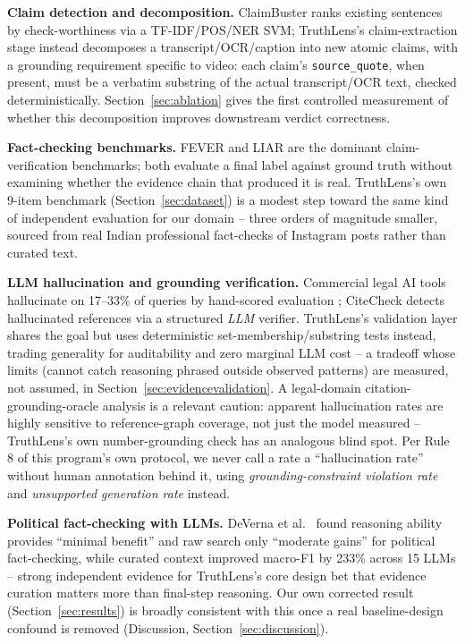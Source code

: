 \documentclass[conference]{IEEEtran}
\begin{document}
\textbf{Claim detection and decomposition.} ClaimBuster
\cite{hassan2017claimbuster} ranks existing sentences by check-worthiness
via a TF-IDF/POS/NER SVM; TruthLens's claim-extraction stage instead
decomposes a transcript/OCR/caption into new atomic claims, with a
grounding requirement specific to video: each claim's
\texttt{source\_quote}, when present, must be a verbatim substring of the
actual transcript/OCR text, checked deterministically.
Section~\ref{sec:ablation} gives the first controlled measurement of
whether this decomposition improves downstream verdict correctness.

\textbf{Fact-checking benchmarks.} FEVER \cite{thorne2018fever} and LIAR
\cite{wang2017liar} are the dominant claim-verification benchmarks; both
evaluate a final label against ground truth without examining whether the
evidence chain that produced it is real. TruthLens's own 9-item benchmark
(Section~\ref{sec:dataset}) is a modest step toward the same kind of
independent evaluation for our domain -- three orders of magnitude
smaller, sourced from real Indian professional fact-checks of Instagram
posts rather than curated text.

\textbf{LLM hallucination and grounding verification.} Commercial legal
AI tools hallucinate on 17--33\% of queries by hand-scored evaluation
\cite{magesh2024hallucinationfree}; CiteCheck \cite{khajavi2026citecheck}
detects hallucinated references via a structured \emph{LLM} verifier.
TruthLens's validation layer shares the goal but uses deterministic
set-membership/substring tests instead, trading generality for
auditability and zero marginal LLM cost -- a tradeoff whose limits
(cannot catch reasoning phrased outside observed patterns) are measured,
not assumed, in Section~\ref{sec:evidencevalidation}. A legal-domain
citation-grounding-oracle analysis is a relevant caution: apparent
hallucination rates are highly sensitive to reference-graph coverage, not
just the model measured \cite{ovcharov2026oracle} -- TruthLens's own
number-grounding check has an analogous blind spot. Per Rule 8 of this
program's own protocol, we never call a rate a ``hallucination rate''
without human annotation behind it, using \emph{grounding-constraint
violation rate} and \emph{unsupported generation rate} instead.

\textbf{Political fact-checking with LLMs.} DeVerna et al.\
\cite{deverna2025curatedcontext} found reasoning ability provides
``minimal benefit'' and raw search only ``moderate gains'' for political
fact-checking, while curated context improved macro-F1 by 233\% across 15
LLMs -- strong independent evidence for TruthLens's core design bet that
evidence curation matters more than final-step reasoning. Our own
corrected result (Section~\ref{sec:results}) is broadly consistent with
this once a real baseline-design confound is removed (Discussion,
Section~\ref{sec:discussion}).
\end{document}

